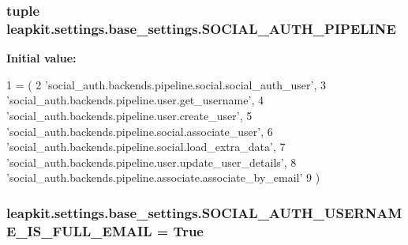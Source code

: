 \hypertarget{namespaceleapkit_1_1settings_1_1base__settings_a71478629e477f7de45fb42fdd8a26304}{
\subsubsection[{S\-O\-C\-I\-A\-L\-\_\-\-A\-U\-T\-H\-\_\-\-P\-I\-P\-E\-L\-I\-N\-E}]{\setlength{\rightskip}{0pt plus 5cm}tuple leapkit.\-settings.\-base\-\_\-settings.\-S\-O\-C\-I\-A\-L\-\_\-\-A\-U\-T\-H\-\_\-\-P\-I\-P\-E\-L\-I\-N\-E}}\label{namespaceleapkit_1_1settings_1_1base__settings_a71478629e477f7de45fb42fdd8a26304}
{\bfseries Initial value\-:}
\begin{DoxyCode}
1 = (
2     \textcolor{stringliteral}{'social\_auth.backends.pipeline.social.social\_auth\_user'},
3     \textcolor{stringliteral}{'social\_auth.backends.pipeline.user.get\_username'},
4     \textcolor{stringliteral}{'social\_auth.backends.pipeline.user.create\_user'},
5     \textcolor{stringliteral}{'social\_auth.backends.pipeline.social.associate\_user'},
6     \textcolor{stringliteral}{'social\_auth.backends.pipeline.social.load\_extra\_data'},
7     \textcolor{stringliteral}{'social\_auth.backends.pipeline.user.update\_user\_details'},
8     \textcolor{stringliteral}{'social\_auth.backends.pipeline.associate.associate\_by\_email'}
9 )
\end{DoxyCode}
\hypertarget{namespaceleapkit_1_1settings_1_1base__settings_a31e1ed7f97cc7b3e6a48e6a26d358233}{
\subsubsection[{S\-O\-C\-I\-A\-L\-\_\-\-A\-U\-T\-H\-\_\-\-U\-S\-E\-R\-N\-A\-M\-E\-\_\-\-I\-S\-\_\-\-F\-U\-L\-L\-\_\-\-E\-M\-A\-I\-L}]{\setlength{\rightskip}{0pt plus 5cm}leapkit.\-settings.\-base\-\_\-settings.\-S\-O\-C\-I\-A\-L\-\_\-\-A\-U\-T\-H\-\_\-\-U\-S\-E\-R\-N\-A\-M\-E\-\_\-\-I\-S\-\_\-\-F\-U\-L\-L\-\_\-\-E\-M\-A\-I\-L = True}}\label{namespaceleapkit_1_1settings_1_1base__settings_a31e1ed7f97cc7b3e6a48e6a26d358233}
